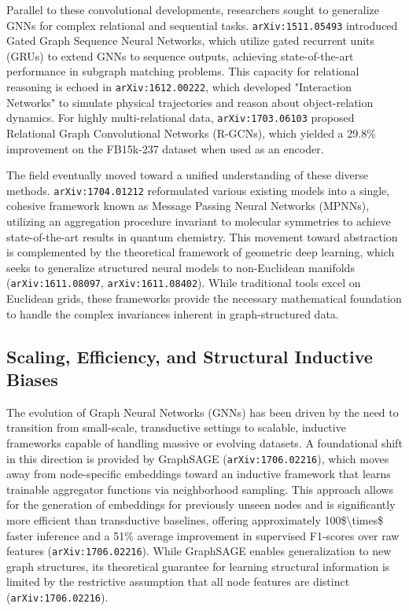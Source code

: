 \documentclass[11pt]{article}
\begin{document}
Parallel to these convolutional developments, researchers sought to generalize GNNs for complex relational and sequential tasks. \texttt{arXiv:1511.05493} introduced Gated Graph Sequence Neural Networks, which utilize gated recurrent units (GRUs) to extend GNNs to sequence outputs, achieving state-of-the-art performance in subgraph matching problems. This capacity for relational reasoning is echoed in \texttt{arXiv:1612.00222}, which developed "Interaction Networks" to simulate physical trajectories and reason about object-relation dynamics. For highly multi-relational data, \texttt{arXiv:1703.06103} proposed Relational Graph Convolutional Networks (R-GCNs), which yielded a 29.8\% improvement on the FB15k-237 dataset when used as an encoder.

The field eventually moved toward a unified understanding of these diverse methods. \texttt{arXiv:1704.01212} reformulated various existing models into a single, cohesive framework known as Message Passing Neural Networks (MPNNs), utilizing an aggregation procedure invariant to molecular symmetries to achieve state-of-the-art results in quantum chemistry. This movement toward abstraction is complemented by the theoretical framework of geometric deep learning, which seeks to generalize structured neural models to non-Euclidean manifolds (\texttt{arXiv:1611.08097}, \texttt{arXiv:1611.08402}). While traditional tools excel on Euclidean grids, these frameworks provide the necessary mathematical foundation to handle the complex invariances inherent in graph-structured data.

\subsection{Scaling, Efficiency, and Structural Inductive Biases}

The evolution of Graph Neural Networks (GNNs) has been driven by the need to transition from small-scale, transductive settings to scalable, inductive frameworks capable of handling massive or evolving datasets. A foundational shift in this direction is provided by GraphSAGE (\texttt{arXiv:1706.02216}), which moves away from node-specific embeddings toward an inductive framework that learns trainable aggregator functions via neighborhood sampling. This approach allows for the generation of embeddings for previously unseen nodes and is significantly more efficient than transductive baselines, offering approximately 100\$\textbackslash{}times\$ faster inference and a 51\% average improvement in supervised F1-scores over raw features (\texttt{arXiv:1706.02216}). While GraphSAGE enables generalization to new graph structures, its theoretical guarantee for learning structural information is limited by the restrictive assumption that all node features are distinct (\texttt{arXiv:1706.02216}).
\end{document}
